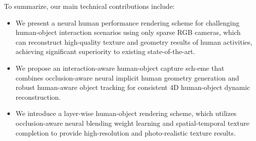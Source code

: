 To summarize, our main technical contributions include:
\begin{itemize}
	\item We present a neural human performance rendering scheme for challenging human-object interaction scenarios using only sparse RGB cameras, which can reconstruct high-quality texture and geometry results of human activities, achieving significant superiority to existing state-of-the-art.
	
	\item We propose an interaction-aware human-object capture sch-eme that combines occlusion-aware neural implicit human geometry generation and robust human-aware object tracking for consistent 4D human-object dynamic reconstruction.
	
	\item We introduce a layer-wise human-object rendering scheme, which utilizes occlusion-aware neural blending weight learning and spatial-temporal texture completion to provide high-resolution and photo-realistic texture results.
\end{itemize}



